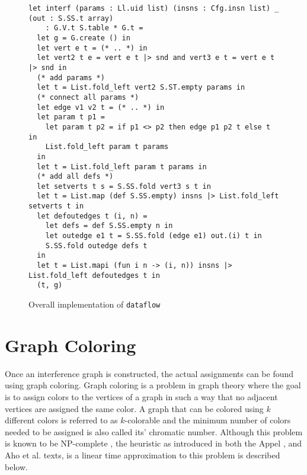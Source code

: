 \documentclass{article}
\begin{document}
\begin{figure}[H]
\begin{verbatim}
let interf (params : Ll.uid list) (insns : Cfg.insn list) _ (out : S.SS.t array)
    : G.V.t S.table * G.t =
  let g = G.create () in
  let vert e t = (* .. *) in
  let vert2 t e = vert e t |> snd and vert3 e t = vert e t |> snd in
  (* add params *)
  let t = List.fold_left vert2 S.ST.empty params in
  (* connect all params *)
  let edge v1 v2 t = (* .. *) in
  let param t p1 =
    let param t p2 = if p1 <> p2 then edge p1 p2 t else t in
    List.fold_left param t params
  in
  let t = List.fold_left param t params in
  (* add all defs *)
  let setverts t s = S.SS.fold vert3 s t in
  let t = List.map (def S.SS.empty) insns |> List.fold_left setverts t in
  let defoutedges t (i, n) =
    let defs = def S.SS.empty n in
    let outedge e1 t = S.SS.fold (edge e1) out.(i) t in
    S.SS.fold outedge defs t
  in
  let t = List.mapi (fun i n -> (i, n)) insns |> List.fold_left defoutedges t in
  (t, g)
\end{verbatim}
\caption{Overall implementation of \texttt{dataflow}\label{fig:dataflow}}
\end{figure}









\section{Graph Coloring}
Once an interference graph is constructed, the actual assignments can be found using graph coloring.
Graph coloring is a problem in graph theory where the goal is to assign colors to the vertices of a graph in such a way that no adjacent vertices are assigned the same color.
A graph that can be colored using \(k\) different colors is referred to as \(k\)-colorable and the minimum number of colors needed to be assigned is also called its' chromatic number.
Although this problem is known to be NP-complete  \cites[229]{tiger}[510]{dragon}, the heuristic as introduced in
both the Appel \cite[229]{tiger}, and Aho et al. \cites[557]{dragon} texts,
is a linear time approximation to this problem is described below.
\end{document}
